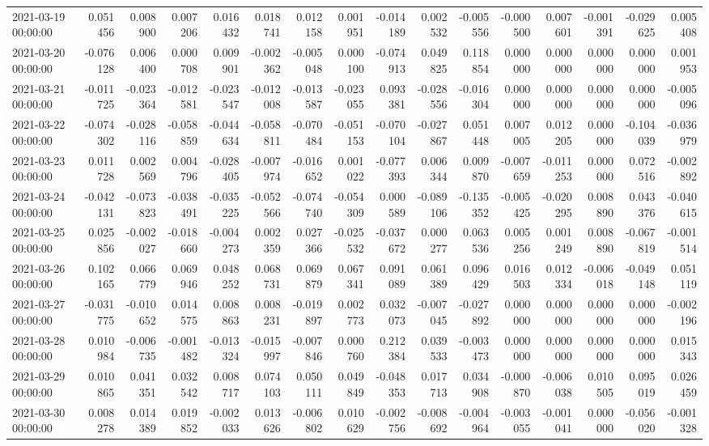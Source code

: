\begin{tabular}{lrrrrrrrrrrrrrrr}
2021-03-19 00:00:00 & 0.051456 & 0.008900 & 0.007206 & 0.016432 & 0.018741 & 0.012158 & 0.001951 & -0.014189 & 0.002532 & -0.005556 & -0.000500 & 0.007601 & -0.001391 & -0.029625 & 0.005408 \\
2021-03-20 00:00:00 & -0.076128 & 0.006400 & 0.000708 & 0.009901 & -0.002362 & -0.005048 & 0.000100 & -0.074913 & 0.049825 & 0.118854 & 0.000000 & 0.000000 & 0.000000 & 0.000000 & 0.001953 \\
2021-03-21 00:00:00 & -0.011725 & -0.023364 & -0.012581 & -0.023547 & -0.012008 & -0.013587 & -0.023055 & 0.093381 & -0.028556 & -0.016304 & 0.000000 & 0.000000 & 0.000000 & 0.000000 & -0.005096 \\
2021-03-22 00:00:00 & -0.074302 & -0.028116 & -0.058859 & -0.044634 & -0.058811 & -0.070484 & -0.051153 & -0.070104 & -0.027867 & 0.051448 & 0.007005 & 0.012205 & 0.000000 & -0.104039 & -0.036979 \\
2021-03-23 00:00:00 & 0.011728 & 0.002569 & 0.004796 & -0.028405 & -0.007974 & -0.016652 & 0.001022 & -0.077393 & 0.006344 & 0.009870 & -0.007659 & -0.011253 & 0.000000 & 0.072516 & -0.002892 \\
2021-03-24 00:00:00 & -0.042131 & -0.073823 & -0.038491 & -0.035225 & -0.052566 & -0.074740 & -0.054309 & 0.000589 & -0.089106 & -0.135352 & -0.005425 & -0.020295 & 0.008890 & 0.043376 & -0.040615 \\
2021-03-25 00:00:00 & 0.025856 & -0.002027 & -0.018660 & -0.004273 & 0.002359 & 0.027366 & -0.025532 & -0.037672 & 0.000277 & 0.063536 & 0.005256 & 0.001249 & 0.008890 & -0.067819 & -0.001514 \\
2021-03-26 00:00:00 & 0.102165 & 0.066779 & 0.069946 & 0.048252 & 0.068731 & 0.069879 & 0.067341 & 0.091089 & 0.061389 & 0.096429 & 0.016503 & 0.012334 & -0.006018 & -0.049148 & 0.051119 \\
2021-03-27 00:00:00 & -0.031775 & -0.010652 & 0.014575 & 0.008863 & 0.008231 & -0.019897 & 0.002773 & 0.032073 & -0.007045 & -0.027892 & 0.000000 & 0.000000 & 0.000000 & 0.000000 & -0.002196 \\
2021-03-28 00:00:00 & 0.010984 & -0.006735 & -0.001482 & -0.013324 & -0.015997 & -0.007846 & 0.000760 & 0.212384 & 0.039533 & -0.003473 & 0.000000 & 0.000000 & 0.000000 & 0.000000 & 0.015343 \\
2021-03-29 00:00:00 & 0.010865 & 0.041351 & 0.032542 & 0.008717 & 0.074103 & 0.050111 & 0.049849 & -0.048353 & 0.017713 & 0.034908 & -0.000870 & -0.006038 & 0.010505 & 0.095019 & 0.026459 \\
2021-03-30 00:00:00 & 0.008278 & 0.014389 & 0.019852 & -0.002033 & 0.013626 & -0.006802 & 0.010629 & -0.002756 & -0.008692 & -0.004964 & -0.003055 & -0.001041 & 0.000000 & -0.056020 & -0.001328 \\

\end{tabular}

